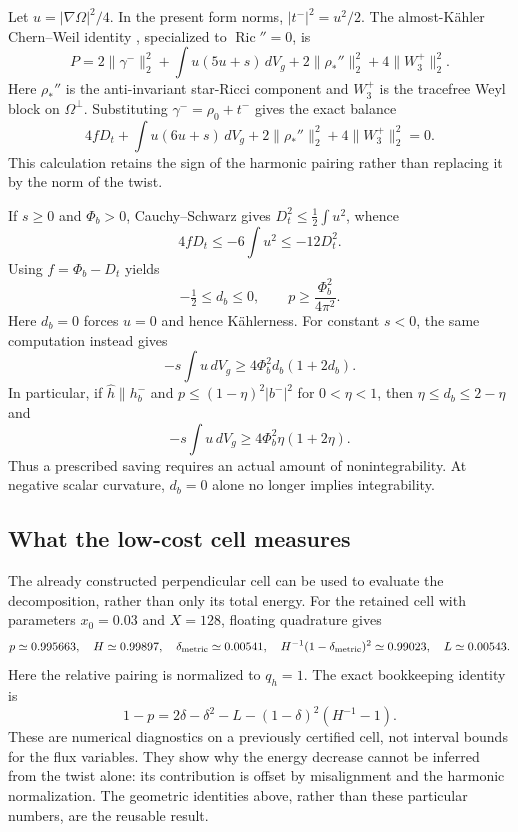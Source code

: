 \documentclass[11pt]{article}
\newcommand{\Ric}{\operatorname{Ric}}
\newcommand{\dd}{\,dV_g}
\theoremstyle{definition}
\theoremstyle{remark}
\begin{document}
Let $u=|\nabla\Omega|^2/4$. In the present form norms,
$|t^-|^2=u^2/2$. The almost-K\"ahler Chern--Weil identity
\cite{AAD}, specialized to $\Ric''=0$, is
\[
 P=2\|\gamma^-\|_2^2+
 \int u(5u+s)\dd+2\|\rho_*''\|_2^2+4\|W_3^+\|_2^2.
\]
Here $\rho_*''$ is the anti-invariant star-Ricci component and $W_3^+$
is the tracefree Weyl block on $\Omega^\perp$. Substituting
$\gamma^-=\rho_0+t^-$ gives the exact balance
\begin{equation}
 \boxed{4fD_t+\int u(6u+s)\dd
       +2\|\rho_*''\|_2^2+4\|W_3^+\|_2^2=0.}
 \label{eq:torsion-balance}
\end{equation}
This calculation retains the sign of the harmonic pairing rather than
replacing it by the norm of the twist.

If $s\ge0$ and $\Phi_b>0$, Cauchy--Schwarz gives
$D_t^2\le\tfrac12\int u^2$, whence
\[
 4fD_t\le-6\int u^2\le-12D_t^2.
\]
Using $f=\Phi_b-D_t$ yields
\begin{equation}
 -\tfrac12\le d_b\le0,\qquad
 p\ge\frac{\Phi_b^2}{4\pi^2}.
 \label{eq:positive-s-twist}
\end{equation}
Here $d_b=0$ forces $u=0$ and hence K\"ahlerness. For constant $s<0$,
the same computation instead gives
\begin{equation}
 \boxed{-s\int u\dd\ge4\Phi_b^2d_b(1+2d_b).}
 \label{eq:negative-s-twist}
\end{equation}
In particular, if $\widehat h\parallel h_b^-$ and
$p\le(1-\eta)^2|b^-|^2$ for $0<\eta<1$, then
$\eta\le d_b\le2-\eta$ and
\[
 -s\int u\dd\ge4\Phi_b^2\eta(1+2\eta).
\]
Thus a prescribed saving requires an actual amount of nonintegrability.
At negative scalar curvature, $d_b=0$ alone no longer implies integrability.

\subsection{What the low-cost cell measures}

The already constructed perpendicular cell can be used to evaluate the
decomposition, rather than only its total energy. For the retained cell
with parameters $x_0=0.03$ and $X=128$, floating quadrature gives
\[
 p\simeq0.995663,\quad H\simeq0.99897,\quad
 \delta_{\rm metric}\simeq0.00541,\quad
 H^{-1}(1-\delta_{\rm metric})^2\simeq0.99023,\quad
 L\simeq0.00543.
\]
Here the relative pairing is normalized to $q_h=1$. The exact bookkeeping
identity is
\[
 1-p=2\delta-\delta^2-L-(1-\delta)^2(H^{-1}-1).
\]
These are numerical diagnostics on a previously certified cell, not
interval bounds for the flux variables. They show why the energy decrease
cannot be inferred from the twist alone: its contribution is offset by
misalignment and the harmonic normalization. The geometric identities
above, rather than these particular numbers, are the reusable result.
\end{document}
